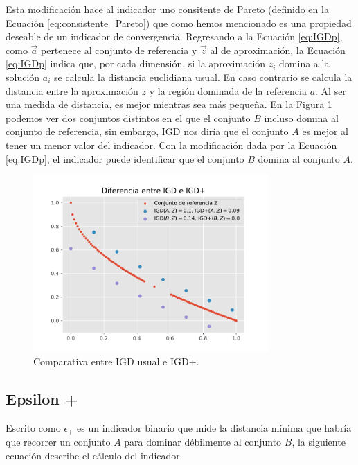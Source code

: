 Esta modificación hace al indicador uno consitente de Pareto (definido en la Ecuación \ref{eq:consistente_Pareto}) que como hemos mencionado es una propiedad deseable de un indicador de convergencia. Regresando a la Ecuación \ref{eq:IGDp}, como $\vec{a}$ pertenece al conjunto de referencia y $\vec{z}$ al de aproximación, la Ecuación \ref{eq:IGDp} indica que, por cada dimensión, si la aproximación $z_i$ domina a la solución $a_i$ se calcula la distancia euclidiana usual. En caso contrario se calcula la distancia entre la aproximación $z$ y la región dominada de la referencia $a$. Al ser una medida de distancia, es mejor mientras sea más pequeña. En la Figura \ref{fig:comp_IGD_IGDp} podemos ver dos conjuntos distintos  en el que el conjunto $B$ incluso domina al conjunto de referencia, sin embargo, IGD nos diría que el conjunto $A$ es mejor al tener un menor valor del indicador. Con la modificación dada por la Ecuación \ref{eq:IGDp}, el indicador puede identificar que el conjunto $B$ domina al conjunto $A$.

\begin{figure}[H]
    \centering
    \includegraphics[width=0.8\textwidth]{./Figuras/igdp_demo.pdf} 
    \caption[IGD vs IGD+]{Comparativa entre IGD usual e IGD$+$.}
    \label{fig:comp_IGD_IGDp}
\end{figure}

\subsection{Epsilon +} \label{sec:Epsilonp}
Escrito como $\epsilon_+$ \cite{epsilonplus} es un indicador binario que mide la distancia mínima que habría que recorrer un conjunto $A$ para dominar débilmente al conjunto $B$, la siguiente ecuación describe el cálculo del indicador

